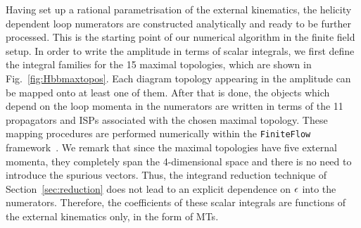 \documentclass[main.tex]{subfiles}
\begin{document}
Having set up a rational parametrisation of the external kinematics, the helicity dependent loop numerators are constructed analytically and
ready to be further processed.
This is the starting point of our numerical algorithm in the finite field setup. 
In order to write the amplitude in terms of scalar integrals, 
we first define the integral families for the 15 maximal topologies, which are shown in Fig.~\ref{fig:Hbbmaxtopos}. 
Each diagram topology appearing in the amplitude can be mapped onto at least one of them. 
After that is done, the objects which depend on the loop momenta in the numerators are written in terms of 
the 11 propagators and ISPs associated with the chosen maximal topology. 
These mapping procedures are performed numerically within the \texttt{FiniteFlow} framework~\cite{Peraro:2019svx}. 
We remark that since the maximal topologies have five external momenta, they completely span the 4-dimensional space and there is no need to introduce the spurious vectors. Thus, the integrand reduction technique of Section~\ref{sec:reduction} does not lead to an explicit dependence on $\epsilon$ into the numerators. Therefore, the coefficients of these scalar integrals are functions of the external kinematics only, in the form of MTs.
\end{document}
